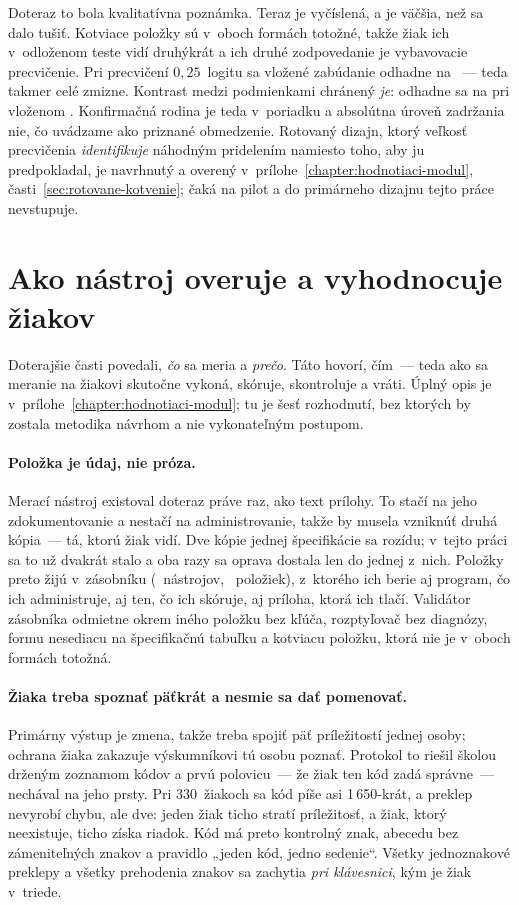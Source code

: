 Doteraz to bola kvalitatívna poznámka. Teraz je vyčíslená, a je väčšia, než sa dalo tušiť. Kotviace položky sú v~oboch formách totožné, takže žiak ich v~odloženom teste vidí druhýkrát a ich druhé zodpovedanie je vybavovacie precvičenie. Pri precvičení $0{,}25$~logitu sa vložené zabúdanie \asmEqPlanted{} odhadne na \asmTeForgetting{}~--- teda takmer celé zmizne. Kontrast medzi podmienkami chránený \emph{je}: odhadne sa na \asmTeContrast{} pri vloženom \asmTeContrastPlanted{}. Konfirmačná rodina je teda v~poriadku a absolútna úroveň zadržania nie, čo uvádzame ako priznané obmedzenie. Rotovaný dizajn, ktorý veľkosť precvičenia \emph{identifikuje} náhodným pridelením namiesto toho, aby ju predpokladal, je navrhnutý a overený v~prílohe~\ref{chapter:hodnotiaci-modul}, časti~\ref{sec:rotovane-kotvenie}; čaká na pilot a do primárneho dizajnu tejto práce nevstupuje.

\section{Ako nástroj overuje a vyhodnocuje žiakov}
\label{sec:hodnotenie-ziakov}

Doterajšie časti povedali, \emph{čo} sa meria a \emph{prečo}. Táto hovorí, čím~--- teda ako sa meranie na žiakovi skutočne vykoná, skóruje, skontroluje a vráti. Úplný opis je v~prílohe~\ref{chapter:hodnotiaci-modul}; tu je šesť rozhodnutí, bez ktorých by zostala metodika návrhom a nie vykonateľným postupom.

\paragraph{Položka je údaj, nie próza.} Merací nástroj existoval doteraz práve raz, ako text prílohy. To stačí na jeho zdokumentovanie a nestačí na administrovanie, takže by musela vzniknúť druhá kópia~--- tá, ktorú žiak vidí. Dve kópie jednej špecifikácie sa rozídu; v~tejto práci sa to už dvakrát stalo a oba razy sa oprava dostala len do jednej z~nich. Položky preto žijú v~zásobníku (\asmBanks{}~nástrojov, \asmItems{}~položiek), z~ktorého ich berie aj program, čo ich administruje, aj ten, čo ich skóruje, aj príloha, ktorá ich tlačí. Validátor zásobníka odmietne okrem iného položku bez kľúča, rozptyľovač bez diagnózy, formu nesediacu na špecifikačnú tabuľku a kotviacu položku, ktorá nie je v~oboch formách totožná.

\paragraph{Žiaka treba spoznať päťkrát a nesmie sa dať pomenovať.} Primárny výstup je zmena, takže treba spojiť päť príležitostí jednej osoby; ochrana žiaka zakazuje výskumníkovi tú osobu poznať. Protokol to riešil školou drženým zoznamom kódov a prvú polovicu~--- že žiak ten kód zadá správne~--- nechával na jeho prsty. Pri 330~žiakoch sa kód píše asi 1\,650-krát, a preklep nevyrobí chybu, ale dve: jeden žiak ticho stratí príležitosť, a žiak, ktorý neexistuje, ticho získa riadok. Kód má preto kontrolný znak, abecedu bez zámeniteľných znakov a pravidlo „jeden kód, jedno sedenie“. Všetky jednoznakové preklepy a všetky prehodenia znakov sa zachytia \emph{pri klávesnici}, kým je žiak v~triede.

